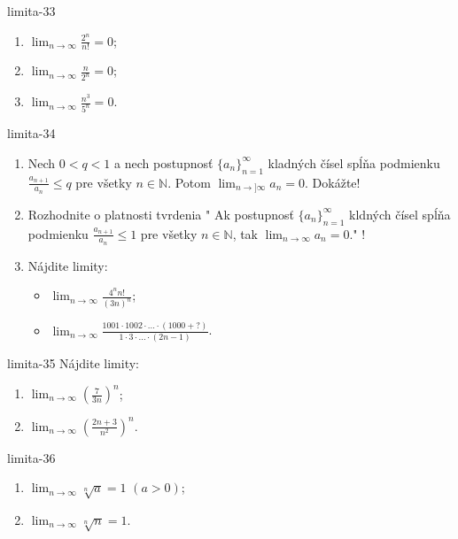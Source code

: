\begin{defproblem}{limita-33}
\begin{enumerate}
\item $\lim_{n \rightarrow \infty} \frac{2^n}{n!}=0$;
\item $\lim_{n \rightarrow \infty} \frac{n}{2^n}=0$;
\item $\lim_{n \rightarrow \infty} \frac{n^3}{5^n}=0$.
\end{enumerate}
\end{defproblem}

\begin{defproblem}{limita-34}
\begin{enumerate}
\item Nech $0<q<1$ a nech postupnosť ${\{a_n\}}_{n=1}^\infty$ kladných čísel spĺňa podmienku $\frac{a_{n+1}}{a_{n}} \leq q$ pre všetky $n \in \mathbb{N}$. Potom $\lim_{n \rightarrow] \infty} a_n=0$. Dokážte!
\item Rozhodnite o platnosti tvrdenia " Ak postupnosť ${\{a_n\}}_{n=1}^\infty$ kldných čísel spĺňa podmienku $\frac{a_{n+1}}{a_{n}} \leq 1$ pre všetky $n \in \mathbb{N}$, tak $\lim_{n \rightarrow \infty} a_n=0$." ! 
\item Nájdite limity:
\begin{itemize}
\item $\lim_{n \rightarrow \infty} \frac{4^n n!}{(3n)^n}$;
\item $\lim_{n \rightarrow \infty} \frac{1001 \cdot 1002 \cdot ... \cdot (1000+?)}{1 \cdot 3 \cdot ... \cdot (2n-1)}$.
\end{itemize}
\end{enumerate}
\end{defproblem}

\begin{defproblem}{limita-35}
Nájdite limity: 
\begin{enumerate}
\item $\lim_{n \rightarrow \infty} (\frac{7}{3n})^n$;
\item $\lim_{n \rightarrow \infty} (\frac{2n+3}{n^2})^n$.
\end{enumerate}
\end{defproblem}

\begin{defproblem}{limita-36}
\begin{enumerate}
\item $\lim_{n \rightarrow \infty} \sqrt[n]{a}=1$  $(a>0)$;
\item $\lim_{n \rightarrow \infty} \sqrt[n]{n}=1$.
\end{enumerate}
\end{defproblem}

